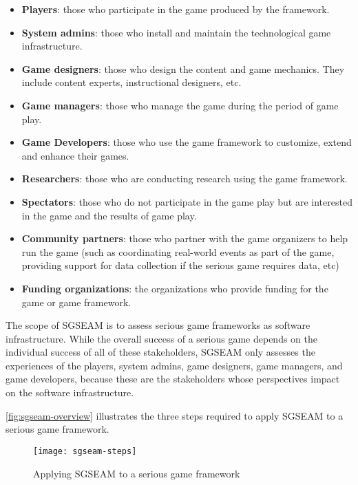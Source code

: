 \begin{itemize}
\item \textbf{Players}: those who participate in the game produced by the framework.
\item \textbf{System admins}: those who install and maintain the technological game infrastructure.
\item \textbf{Game designers}: those who design the content and game mechanics. They include  content experts, instructional designers, etc.
\item \textbf{Game managers}: those who manage the game during the period of game play.
\item \textbf{Game Developers}: those who use the game framework to customize, extend and enhance their games.
\item \textbf{Researchers}: those who are conducting research using the game framework.
\item \textbf{Spectators}: those who do not participate in the game play but are interested in the game and the results of game play. 
\item \textbf{Community partners}: those who partner with the game organizers to help run the game (such as coordinating real-world events as part of the game, providing support for data
  collection if the serious game requires data, etc) 
\item \textbf{Funding organizations}: the organizations who provide funding for the game or game framework.
\end{itemize}

The scope of SGSEAM is to assess serious game frameworks as software infrastructure. While
the overall success of a serious game depends on the individual success of all of these
stakeholders, SGSEAM only assesses the experiences of the players, system admins, game designers, game managers, and game developers, because these are the stakeholders whose perspectives impact on the software infrastructure. 

\autoref{fig:sgseam-overview} illustrates the three steps required to apply SGSEAM to a serious game framework.

\begin{figure}[ht!]
  \center
  \texttt{[image: sgseam-steps]}
  \caption{Applying SGSEAM to a serious game framework}
  \label{fig:sgseam-overview}
\end{figure}

